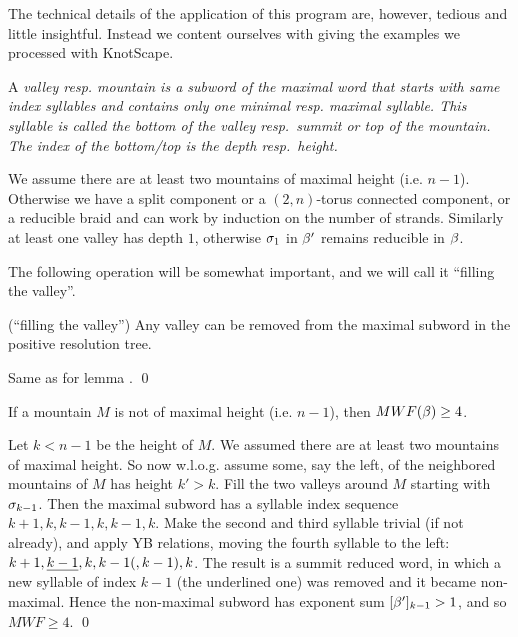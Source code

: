 The technical details of the application of this program are,
however, tedious and little insightful. Instead we content
ourselves with giving the examples we processed with KnotScape.


\begin{defi}
A \em{valley} resp. \em{mountain} is a subword of the maximal word
that starts with same index syllables and contains only one minimal
resp. maximal syllable. This syllable is called the \em{bottom} of
the valley resp.\ \em{summit} or \em{top} of the mountain.
The index of the bottom/top is the \em{depth} resp.\ \em{height}.
\end{defi}

We assume there are at least two mountains of maximal height (i.e.
$n-1$). Otherwise we have a split component or a $(2,n)$-torus
connected component, or a reducible braid and can work by induction
on the number of strands. Similarly at least one valley has
depth $1$, otherwise $\sigma_1$ in $\beta'$ remains reducible in $\beta$.

The following operation will be somewhat important, and we will
call it ``filling the valley''.

\begin{lemma}(``filling the valley'')
Any valley can be removed from the maximal subword in the positive
resolution tree.
\end{lemma}

\proof Same as for lemma . \qed

\begin{lemma}
If a mountain $M$ is not of maximal height
(i.e. $n-1$), then $MWF(\beta)\ge 4$.
\end{lemma}

\proof Let $k<n-1$ be the height of $M$.
We assumed there are at least two mountains of maximal height. So
now w.l.o.g. assume some, say
the left, of the neighbored mountains of $M$ has height $k'>k$.
Fill the two valleys around $M$ starting with $\sigma_{k-1}$.
Then the maximal subword has a syllable index sequence
$k+1,k,k-1,k,k-1,k$. Make the second and third syllable trivial
(if not already), and apply YB relations, moving the fourth
syllable to the left: $k+1,\underline{k-1},k,k-1(,k-1),k$. The result is a
summit reduced word, in which a new syllable of index $k-1$
(the underlined one) was removed and it became non-maximal. Hence the
non-maximal subword has exponent sum $[\beta']_{k-1}>1$, and so
$MWF\ge 4$. \qed

